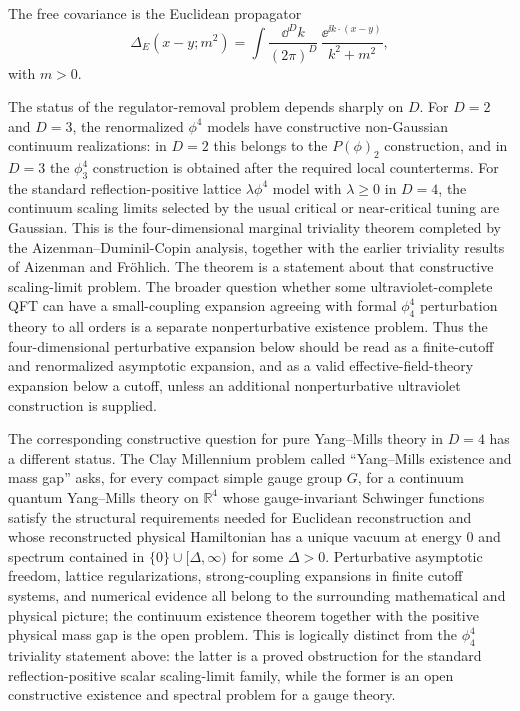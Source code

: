 \begin{definition}
The free covariance is the Euclidean propagator
\[
  \Delta_E(x-y;m^2)
  =
  \int \frac{\dd^D k}{(2\pi)^D}\,
  \frac{\ee^{\ii k\cdot(x-y)}}{k^2+m^2},
\]
with \(m>0\).

The status of the regulator-removal problem depends sharply on \(D\).  For
\(D=2\) and \(D=3\), the renormalized \(\phi^4\) models have constructive
non-Gaussian continuum realizations: in \(D=2\) this belongs to the
\(P(\phi)_2\) construction, and in \(D=3\) the \(\phi^4_3\) construction is
obtained after the required local counterterms.  For the standard
reflection-positive lattice \(\lambda\phi^4\) model with \(\lambda\ge0\) in
\(D=4\), the continuum scaling limits selected by the usual critical or
near-critical tuning are Gaussian.  This is the four-dimensional marginal
triviality theorem completed by the Aizenman--Duminil-Copin analysis, together
with the earlier triviality results of Aizenman and Fr\"ohlich.  The theorem is
a statement about that constructive scaling-limit problem.  The broader
question whether some ultraviolet-complete QFT can have a small-coupling
expansion agreeing with formal \(\phi^4_4\) perturbation theory to all orders
is a separate nonperturbative existence problem.  Thus the four-dimensional
perturbative expansion below should be read as a finite-cutoff and renormalized
asymptotic expansion, and as a valid effective-field-theory expansion below a
cutoff, unless an additional nonperturbative ultraviolet construction is
supplied.

The corresponding constructive question for pure Yang--Mills theory in
\(D=4\) has a different status.  The Clay Millennium problem called
``Yang--Mills existence and mass gap'' asks, for every compact simple gauge
group \(G\), for a continuum quantum Yang--Mills theory on \(\mathbb R^4\)
whose gauge-invariant Schwinger functions satisfy the structural requirements
needed for Euclidean reconstruction and whose reconstructed physical
Hamiltonian has a unique vacuum at energy \(0\) and spectrum contained in
\(\{0\}\cup[\Delta,\infty)\) for some \(\Delta>0\).  Perturbative asymptotic
freedom, lattice regularizations, strong-coupling expansions in finite cutoff
systems, and numerical evidence all belong to the surrounding mathematical and
physical picture; the continuum existence theorem together with the positive
physical mass gap is the open problem.  This is logically distinct from the
\(\phi^4_4\) triviality statement above: the latter is a proved obstruction
for the standard reflection-positive scalar scaling-limit family, while the
former is an open constructive existence and spectral problem for a gauge
theory.


\end{definition}
